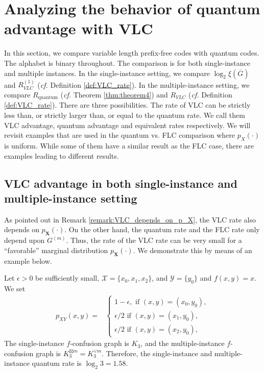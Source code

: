 \documentclass[journal, onecolumn, draftcls]{IEEEtran}
\theoremstyle{definition}
\newcommand{\calX}{\mathcal{X}}
\newcommand{\calY}{\mathcal{Y}}
\newcommand{\bfX}{\mathbf{X}}
\newcommand{\meng}[1]{\marginpar{+}{\bf Ruoyu's remark}: {\em #1}}
\newcommand{\aditya}[1]{\marginpar{+}{\bf Aditya's remark}: {\em #1}}
\begin{document}
\section{Analyzing the behavior of quantum advantage with VLC}\label{sec:analysis_bahavior_quantum_advantage_vlc} 

In this section, we compare variable length prefix-free codes with quantum codes. The alphabet is binary throughout. %
The comparison is for both single-instance and multiple instances. In the single-instance setting, we compare $\log_2\xi(\overline{G})$ and $R^{(1)}_{VLC}$ ({\it cf.} Definition \ref{def:VLC_rate}). In the multiple-instance setting, we compare $R_{\text{quantum}}$ ({\it cf.} Theorem \ref{thm:theorem4}) and $R_{VLC}$ ({\it cf.} Definition \ref{def:VLC_rate}).  There are three possibilities.  The rate of VLC can be strictly less than, or strictly larger than, or equal to  the quantum rate. We call them VLC advantage, quantum advantage and equivalent rates respectively. We will revisit examples that are used in the quantum vs. FLC comparison where $p_X(\cdot)$ is uniform. While some of them have a similar result as the FLC case, there are  examples leading to different results.

\subsection{VLC advantage   in both single-instance and multiple-instance  setting\label{sec:VLC_k3}}
 
As pointed out in Remark \ref{remark:VLC_depends_on_p_X}, the VLC rate also depends on $p_{\bfX}(\cdot)$. On the other hand, the quantum rate and the FLC rate only depend upon $G^{(m)}$. Thus, the rate of the VLC rate can be very small for a ``favorable'' marginal distribution $p_{\bfX}(\cdot)$. We demonstrate this by means of an example below.



Let $\epsilon>0$ be sufficiently small, $\calX=\{x_0,x_1,x_2\}$, and $\calY=\{y_0\}$ and $f(x,y) = x$.  We set 
\begin{align*}
 p_{XY}(x,y) =&\begin{cases}
     1-\epsilon,\text{ if }(x,y)=(x_0,y_0),\\
     \epsilon/ 2 \text{ if }(x,y) = (x_1,y_0),\\
     \epsilon/2  \text{ if }(x,y) = (x_2,y_0),
 \end{cases}%
\end{align*} 
The single-instance $f$-confusion graph is $K_3$, and the multiple-instance $f$-confusion graph is $K_3^{\boxtimes m}=K_3^{\lor m}$. Therefore, the single-instance and multiple-instance quantum rate is $\log_2 3 = 1.58$.
\end{document}
